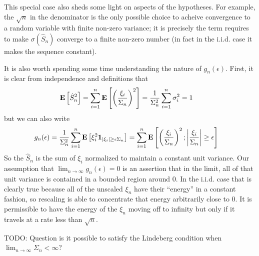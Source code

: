 \documentclass{amsart}
\theoremstyle{remark}
\theoremstyle{definition}
\begin{document}
This special case also sheds some light on aspects of the hypotheses.
For example, the $\sqrt{n}$ in the denominator is the only possible
choice to acheive convergence to a random variable with finite
non-zero variance; it is precisely the term requires to make
$\sigma(\hat{S}_n)$ converge to a finite non-zero number (in fact in
the i.i.d. case it makes the sequence constant).  

It is also worth spending some time understanding the nature of
$g_n(\epsilon)$.  First, it is clear from independence and definitions that 
\begin{align*}
\textbf{E}\left[\hat{S}_n^2\right] &= \sum_{i=1}^n \textbf{E}\left[\left
    (\frac{\xi_i}{\Sigma_n} \right )^2\right] = \frac{1}{\Sigma_n^2}
\sum_{i=1}^n \sigma_i^2 = 1
\end{align*}
but we can also write 
\begin{align*}
g_n(\epsilon) &= \frac{1}{\Sigma_n^2} \sum_{i=1}^n \textbf{E}\left[\xi_i^2
  \textbf{1}_{|\xi_i| \geq \epsilon \Sigma_n}\right] = \sum_{i=1}^n
\textbf{E}\left[\left (\frac{\xi_i}{\Sigma_n}\right )^2
  ; \left \vert \frac{\xi_i}{\Sigma_n} \right \vert \geq \epsilon\right]
\end{align*}
So the $\hat{S}_n$ is the sum of $\xi_i$ normalized to maintain a
constant unit variance.  Our assumption that $\lim_{n \to \infty}
g_n(\epsilon) = 0$ is an assertion that in the limit, all of that unit
variance is contained in a bounded region around $0$.  In the
i.i.d. case that is clearly true because all of the unscaled $\xi_n$
have their ``energy'' in a constant fashion, so rescaling is able to
concentrate that energy arbitrarily close to $0$.  It is permissible
to have the energy of the $\xi_n$ moving off to infinity but only if
it travels at a rate less than $\sqrt{n}$.

TODO: Question is it possible to satisfy the Lindeberg condition when
$\lim_{n \to \infty} \Sigma_n < \infty$?
\end{document}
